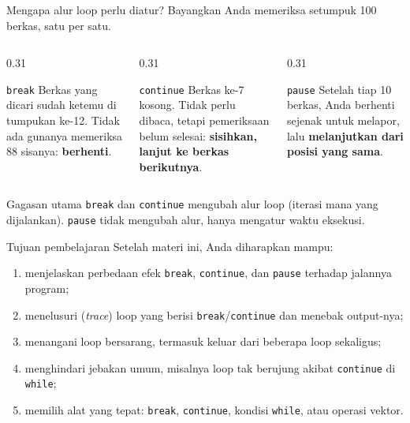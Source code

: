 \documentclass[aspectratio=169,10pt]{beamer}
\newcommand{\kode}[1]{\texttt{#1}}
\begin{document}
\begin{frame}[fragile]{Mengapa alur loop perlu diatur?}
  Bayangkan Anda memeriksa setumpuk 100 berkas, satu per satu.
  \vspace{6pt}
  \begin{columns}[T]
    \begin{column}{0.31\textwidth}
      \begin{block}{\kode{break}}
        Berkas yang dicari \alert{sudah ketemu} di tumpukan ke-12. Tidak ada gunanya memeriksa 88 sisanya:
        \textbf{berhenti}.
      \end{block}
    \end{column}
    \begin{column}{0.31\textwidth}
      \begin{block}{\kode{continue}}
        Berkas ke-7 \alert{kosong}. Tidak perlu dibaca, tetapi pemeriksaan belum selesai:
        \textbf{sisihkan, lanjut ke berkas berikutnya}.
      \end{block}
    \end{column}
    \begin{column}{0.31\textwidth}
      \begin{block}{\kode{pause}}
        Setelah tiap 10 berkas, Anda \alert{berhenti sejenak} untuk melapor, lalu
        \textbf{melanjutkan dari posisi yang sama}.
      \end{block}
    \end{column}
  \end{columns}
  \vspace{8pt}
  \begin{alertblock}{Gagasan utama}
    \kode{break} dan \kode{continue} mengubah \alert{alur} loop (iterasi mana yang dijalankan).
    \kode{pause} tidak mengubah alur, hanya mengatur \alert{waktu} eksekusi.
  \end{alertblock}
\end{frame}

\begin{frame}[fragile]{Tujuan pembelajaran}
  Setelah materi ini, Anda diharapkan mampu:
  \begin{enumerate}
    \item menjelaskan perbedaan efek \kode{break}, \kode{continue}, dan \kode{pause} terhadap jalannya program;
    \item menelusuri (\textit{trace}) loop yang berisi \kode{break}/\kode{continue} dan menebak output-nya;
    \item menangani loop bersarang, termasuk keluar dari beberapa loop sekaligus;
    \item menghindari jebakan umum, misalnya loop tak berujung akibat \kode{continue} di \kode{while};
    \item memilih alat yang tepat: \kode{break}, \kode{continue}, kondisi \kode{while}, atau operasi vektor.
  \end{enumerate}
\end{frame}
\end{document}
